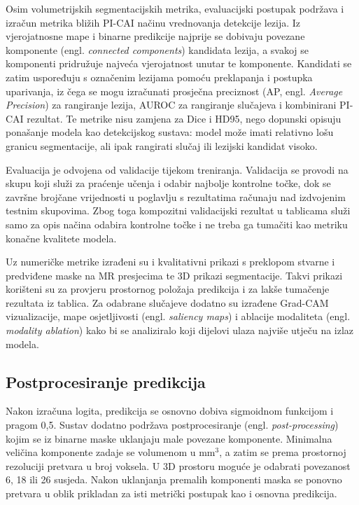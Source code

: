 \documentclass[a4paper,12pt,oneside]{article}
\begin{document}
Osim volumetrijskih segmentacijskih metrika, evaluacijski postupak podržava i izračun metrika bližih PI-CAI načinu vrednovanja detekcije lezija. Iz vjerojatnosne mape i binarne predikcije najprije se dobivaju povezane komponente (engl. \textit{connected components}) kandidata lezija, a svakoj se komponenti pridružuje najveća vjerojatnost unutar te komponente. Kandidati se zatim uspoređuju s označenim lezijama pomoću preklapanja i postupka uparivanja, iz čega se mogu izračunati prosječna preciznost (AP, engl. \textit{Average Precision}) za rangiranje lezija, AUROC za rangiranje slučajeva i kombinirani PI-CAI rezultat. Te metrike nisu zamjena za Dice i HD95, nego dopunski opisuju ponašanje modela kao detekcijskog sustava: model može imati relativno lošu granicu segmentacije, ali ipak rangirati slučaj ili lezijski kandidat visoko.


Evaluacija je odvojena od validacije tijekom treniranja. Validacija se provodi na skupu koji služi za praćenje učenja i odabir najbolje kontrolne točke, dok se završne brojčane vrijednosti u poglavlju s rezultatima računaju nad izdvojenim testnim skupovima. Zbog toga kompozitni validacijski rezultat u tablicama služi samo za opis načina odabira kontrolne točke i ne treba ga tumačiti kao metriku konačne kvalitete modela.

Uz numeričke metrike izrađeni su i kvalitativni prikazi s preklopom stvarne i predviđene maske na MR presjecima te 3D prikazi segmentacije. Takvi prikazi korišteni su za provjeru prostornog položaja predikcija i za lakše tumačenje rezultata iz tablica. Za odabrane slučajeve dodatno su izrađene Grad-CAM vizualizacije, mape osjetljivosti (engl. \textit{saliency maps}) i ablacije modaliteta (engl. \textit{modality ablation}) kako bi se analiziralo koji dijelovi ulaza najviše utječu na izlaz modela.

\subsection{Postprocesiranje predikcija}

Nakon izračuna logita, predikcija se osnovno dobiva sigmoidnom funkcijom i pragom 0,5. Sustav dodatno podržava postprocesiranje (engl. \textit{post-processing}) kojim se iz binarne maske uklanjaju male povezane komponente. Minimalna veličina komponente zadaje se volumenom u mm$^3$, a zatim se prema prostornoj rezoluciji pretvara u broj voksela. U 3D prostoru moguće je odabrati povezanost 6, 18 ili 26 susjeda. Nakon uklanjanja premalih komponenti maska se ponovno pretvara u oblik prikladan za isti metrički postupak kao i osnovna predikcija.
\end{document}

